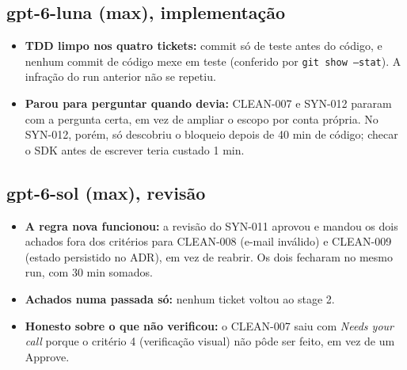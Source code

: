 \documentclass[11pt,a4paper]{article}
\begin{document}
\subsection*{gpt-6-luna (max), implementação}
\begin{itemize}
  \item \textbf{TDD limpo nos quatro tickets:} commit só de teste antes do
        código, e nenhum commit de código mexe em teste (conferido por
        \texttt{git show --stat}). A infração do run anterior não se repetiu.
  \item \textbf{Parou para perguntar quando devia:} CLEAN-007 e SYN-012
        pararam com a pergunta certa, em vez de ampliar o escopo por conta
        própria. No SYN-012, porém, só descobriu o bloqueio depois de 40 min de
        código; checar o SDK antes de escrever teria custado 1 min.
\end{itemize}

\subsection*{gpt-6-sol (max), revisão}
\begin{itemize}
  \item \textbf{A regra nova funcionou:} a revisão do SYN-011 aprovou e mandou
        os dois achados fora dos critérios para CLEAN-008 (e-mail inválido) e
        CLEAN-009 (estado persistido no ADR), em vez de reabrir. Os dois
        fecharam no mesmo run, com 30 min somados.
  \item \textbf{Achados numa passada só:} nenhum ticket voltou ao stage 2.
  \item \textbf{Honesto sobre o que não verificou:} o CLEAN-007 saiu com
        \emph{Needs your call} porque o critério 4 (verificação visual) não
        pôde ser feito, em vez de um Approve.
\end{itemize}
\end{document}
